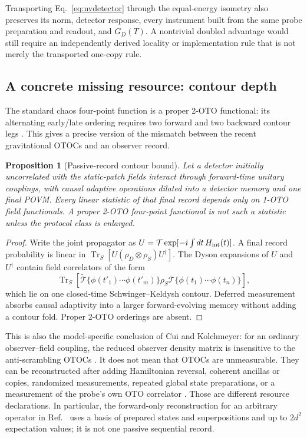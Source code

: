 \documentclass[11pt]{article}
\newtheorem{proposition}{Proposition}
\newcommand{\Tr}{\operatorname{Tr}}
\begin{document}
Transporting Eq.~\eqref{eq:nvdetector} through the equal-energy isometry also
preserves its norm, detector response, every instrument built from the same
probe preparation and readout, and $G_D(T)$.  A nontrivial doubled advantage
would still require an independently derived locality or implementation rule
that is not merely the transported one-copy rule.

\subsection*{A concrete missing resource: contour depth}
The standard chaos four-point function is a proper 2-OTO functional: its
alternating early/late ordering requires two forward and two backward contour
legs \citep{HaehlLoganayagamNarayanRangamani2017}.  This gives a precise
version of the mismatch between the recent gravitational OTOCs and an
observer record.

\begin{proposition}[Passive-record contour bound]
\label{prop:contour}
Let a detector initially uncorrelated with the static-patch fields interact
through forward-time unitary couplings, with causal adaptive operations
dilated into a detector memory and one final POVM.  Every linear statistic of
that final record depends only on 1-OTO field functionals.  A proper 2-OTO
four-point functional is not such a statistic unless the protocol class is
enlarged.
\end{proposition}

\begin{proof}
Write the joint propagator as
$U=\mathcal T\exp[-i\int dt\,H_{\rm int}(t)]$.  A final record probability is
linear in
$\Tr_S[U(\rho_D\otimes\rho_S)U^\dagger]$.  The Dyson expansions of $U$ and
$U^\dagger$ contain field correlators of the form
\begin{equation}
 \Tr_S\!\left[
 \widetilde{\mathcal T}\{\phi(t'_1)\cdots\phi(t'_m)\}
 \rho_S
 \mathcal T\{\phi(t_1)\cdots\phi(t_n)\}
 \right],
\end{equation}
which lie on one closed-time Schwinger--Keldysh contour.  Deferred
measurement absorbs causal adaptivity into a larger forward-evolving memory
without adding a contour fold.  Proper 2-OTO orderings are absent.
\end{proof}

This is also the model-specific conclusion of Cui and Kolchmeyer: for an
ordinary observer--field coupling, the reduced observer density matrix is
insensitive to the anti-scrambling OTOCs
\citep{CuiKolchmeyer2026}.  It does not mean that OTOCs are unmeasurable.
They can be reconstructed after adding Hamiltonian reversal, coherent
ancillas or copies, randomized measurements, repeated global state
preparations, or a measurement of the probe's own OTO correlator
\citep{ChaudhuriLoganayagam2018,BlocherEtAl2020,ZonniosEtAl2021}.  Those are different
resource declarations.  In particular, the forward-only reconstruction for
an arbitrary operator in Ref.~\citep{BlocherEtAl2020} uses a basis of prepared
states and superpositions and up to $2d^2$ expectation values; it is not one
passive sequential record.
\end{document}
